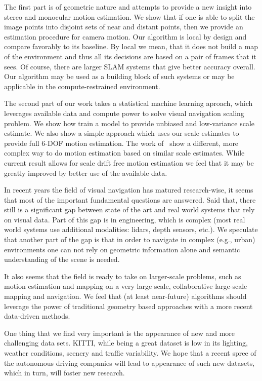 The first part is of geometric nature and attempts to provide a new
insight into stereo and monocular motion estimation.  We show that if
one is able to split the image points into disjoint sets of near and
distant points, then we provide an estimation procedure for camera
motion.  Our algorithm is local by design and compare favorably to its
baseline.  By local we mean, that it does not build a map of the
environment and thus all its decisions are based on a pair of frames
that it sees.  Of course, there are larger SLAM systems that give
better accuracy overall.  Our algorithm may be used as a building
block of such systems or may be applicable in the compute-restrained
environment.

The second part of our work takes a statistical machine learning
aproach, which leverages available data and compute power to solve
visual navigation scaling problem.  We show how train a model to
provide unbiased and low-variance scale estimate.  We also show a
simple approach which uses our scale estimates to provide full 6-DOF
motion estimation.  The work of~\cite{frost2017using} show a
different, more complex way to do motion estimation based on similar
scale estimates.  While current result allows for scale drift free
motion estimation we feel that it may be greatly improved by better
use of the available data.

In recent years the field of visual navigation has matured
research-wise, it seems that most of the important fundamental
questions are answered.  Said that, there still is a significant gap
between state of the art and real world systems that rely on visual
data.  Part of this gap is in engineering, which is complex (most real
world systems use additional modalities: lidars, depth sensors,
etc.). We speculate that another part of the gap is that in order to
navigate in complex (e.g., urban) environments one can not rely on
geometric information alone and semantic understanding of the scene is
needed.

It also seems that the field is ready to take on larger-scale
problems, such as motion estimation and mapping on a very large scale,
collaborative large-scale mapping and navigation.  We feel that (at
least near-future) algorithms should leverage the power of traditional
geometry based approaches with a more recent data-driven methods.

One thing that we find very important is the appearance of new and
more challenging data sets.  KITTI, while being a great dataset is low
in its lighting, weather conditions, scenery and traffic variability.
We hope that a recent spree of the autonomous driving companies will
lead to appearance of such new datasets, which in turn, will foster
new research.


